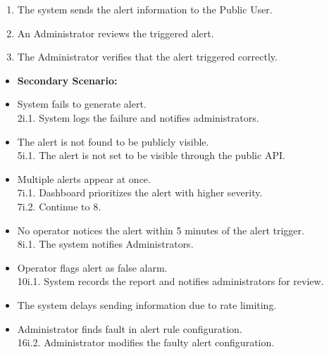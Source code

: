 \documentclass[]{article}
\begin{document}
\begin{enumerate}[{\bf BE1.}]
\begin{enumerate}[1.]
			\item The system sends the alert information to the Public User.
			\item An Administrator reviews the triggered alert.
			\item The Administrator verifies that the alert triggered correctly.
		\end{enumerate}
		\begin{itemize}
			\item[] {\bf Secondary Scenario:}
			\item[2i.] System fails to generate alert. \\
			\hspace{1cm}2i.1. System logs the failure and notifies administrators.
			\item[5i.] The alert is not found to be publicly visible. \\
			\hspace{1cm}5i.1. The alert is not set to be visible through the public API.
			\item[7i.] Multiple alerts appear at once. \\
			\hspace{1cm}7i.1. Dashboard prioritizes the alert with higher severity. \\
			\hspace{1cm}7i.2. Continue to 8.
			\item[8i.] No operator notices the alert within 5 minutes of the alert trigger. \\
			\hspace{1cm}8i.1. The system notifies Administrators.
			\item[10i.] Operator flags alert as false alarm. \\
			\hspace{1cm}10i.1. System records the report and notifies administrators for review.
			\item[14i.] The system delays sending information due to rate limiting.
			\item[16i.] Administrator finds fault in alert rule configuration. \\
			\hspace{1cm}16i.2. Administrator modifies the faulty alert configuration.
		\end{itemize}




\end{enumerate}
\end{document}
